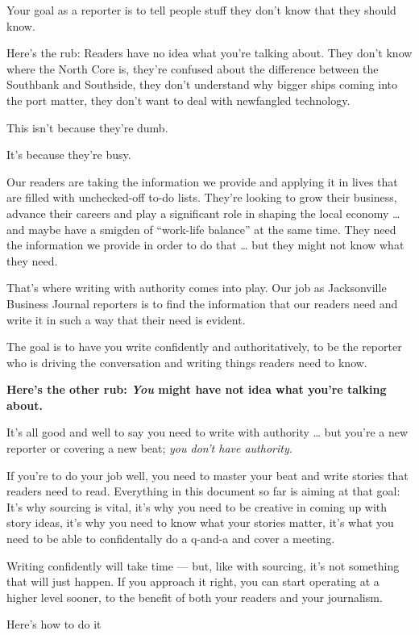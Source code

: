 \documentclass[
  12pt,
  american,
  letterpaperpaper,
  extrafontsizes,onecolumn,openright
  ]{memoir}
\begin{document}
Your goal as a reporter is to tell people stuff they don't know that they should know.

Here's the rub: Readers have no idea what you're talking about. They don't know where the North Core is, they're confused about the difference between the Southbank and Southside, they don't understand why bigger ships coming into the port matter, they don't want to deal with newfangled technology.

This isn't because they're dumb.

It's because they're busy.

Our readers are taking the information we provide and applying it in lives that are filled with unchecked-off to-do lists. They're looking to grow their business, advance their careers and play a significant role in shaping the local economy \ldots{} and maybe have a smigden of \enquote{work-life balance} at the same time. They need the information we provide in order to do that \ldots{} but they might not know what they need.

That's where writing with authority comes into play. Our job as Jacksonville Business Journal reporters is to find the information that our readers need and write it in such a way that their need is evident.

The goal is to have you write confidently and authoritatively, to be the reporter who is driving the conversation and writing things readers need to know.

\textbf{Here's the other rub: \emph{You} might have not idea what you're talking about.}

It's all good and well to say you need to write with authority \ldots{} but you're a new reporter or covering a new beat; \emph{you don't have authority.}

If you're to do your job well, you need to master your beat and write stories that readers need to read. Everything in this document so far is aiming at that goal: It's why sourcing is vital, it's why you need to be creative in coming up with story ideas, it's why you need to know what your stories matter, it's what you need to be able to confidentally do a q-and-a and cover a meeting.

Writing confidently will take time --- but, like with sourcing, it's not something that will just happen. If you approach it right, you can start operating at a higher level sooner, to the benefit of both your readers and your journalism.

Here's how to do it
\end{document}
